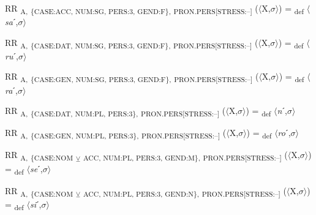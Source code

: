 {\begin{exe}
 RR \textsubscript{A,} \textsubscript{\{CASE:ACC, NUM:SG, PERS:3, GEND:F\},} \textsubscript{PRON.PERS[STRESS:–]} ($\langle$X,$\sigma $$\rangle$) = \textsubscript{def} $\langle$\textit{sa}ˊ,$\sigma $$\rangle$
\end{exe}

\begin{exe}
 RR \textsubscript{A,} \textsubscript{\{CASE:DAT, NUM:SG, PERS:3, GEND:F\},} \textsubscript{PRON.PERS[STRESS:–]} ($\langle$X,$\sigma $$\rangle$) = \textsubscript{def} $\langle$\textit{ru}ˊ,$\sigma $$\rangle$
\end{exe}

\begin{exe}
 RR \textsubscript{A,} \textsubscript{\{CASE:GEN, NUM:SG, PERS:3, GEND:F\},} \textsubscript{PRON.PERS[STRESS:–]} ($\langle$X,$\sigma $$\rangle$) = \textsubscript{def} $\langle$\textit{ra}ˊ,$\sigma $$\rangle$
\end{exe}

\begin{exe}
 RR \textsubscript{A,} \textsubscript{\{CASE:DAT, NUM:PL, PERS:3\},} \textsubscript{PRON.PERS[STRESS:–]} ($\langle$X,$\sigma $$\rangle$) = \textsubscript{def} $\langle$\textit{n}ˊ,$\sigma $$\rangle$
\end{exe}

\begin{exe}
 RR \textsubscript{A,} \textsubscript{\{CASE:GEN, NUM:PL, PERS:3\},} \textsubscript{PRON.PERS[STRESS:–]} ($\langle$X,$\sigma $$\rangle$) = \textsubscript{def} $\langle$\textit{ro}ˊ,$\sigma $$\rangle$
\end{exe}

\begin{exe}
 RR \textsubscript{A,} \textsubscript{\{CASE:NOM} \textsubscript{${\veebar}$} \textsubscript{ACC, NUM:PL, PERS:3, GEND:M\},} \textsubscript{PRON.PERS[STRESS:–]} ($\langle$X,$\sigma $$\rangle$) = \textsubscript{def} $\langle$\textit{se}ˊ,$\sigma $$\rangle$
\end{exe}

\begin{exe}
 RR \textsubscript{A,} \textsubscript{\{CASE:NOM} \textsubscript{${\veebar}$} \textsubscript{ACC, NUM:PL, PERS:3, GEND:N\},} \textsubscript{PRON.PERS[STRESS:–]} ($\langle$X,$\sigma $$\rangle$) = \textsubscript{def} $\langle$\textit{si}ˊ,$\sigma $$\rangle$
\end{exe}

}
